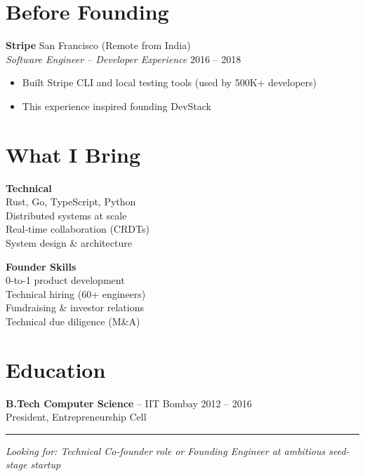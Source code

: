 \documentclass[11pt,letterpaper]{article}
\begin{document}
\section{Before Founding}

\textbf{Stripe} \hfill San Francisco (Remote from India)\\
\textit{Software Engineer -- Developer Experience} \hfill 2016 -- 2018
\begin{itemize}
\item Built Stripe CLI and local testing tools (used by 500K+ developers)
\item This experience inspired founding DevStack
\end{itemize}

\section{What I Bring}

\begin{minipage}[t]{0.48\linewidth}
\textbf{Technical}\\
Rust, Go, TypeScript, Python\\
Distributed systems at scale\\
Real-time collaboration (CRDTs)\\
System design \& architecture
\end{minipage}\hfill
\begin{minipage}[t]{0.48\linewidth}
\textbf{Founder Skills}\\
0-to-1 product development\\
Technical hiring (60+ engineers)\\
Fundraising \& investor relations\\
Technical due diligence (M\&A)
\end{minipage}

\vspace{12pt}

\section{Education}

\textbf{B.Tech Computer Science} -- IIT Bombay \hfill 2012 -- 2016\\
{\small President, Entrepreneurship Cell}

\vspace{8pt}
\noindent\rule{\linewidth}{2pt}
\begin{center}
\textit{\color{foundergray}Looking for: Technical Co-founder role or Founding Engineer at ambitious seed-stage startup}
\end{center}
\end{document}
